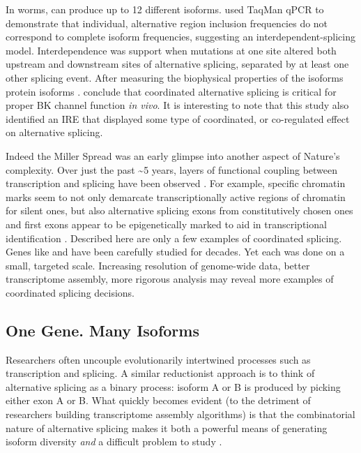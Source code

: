     In worms, \slo{} can produce up to 12 different isoforms. \citet{Glauser2011} used TaqMan qPCR to demonstrate that individual, alternative region inclusion frequencies do not correspond to complete isoform frequencies, suggesting an interdependent-splicing model. Interdependence was support when mutations at one site altered both upstream and downstream sites of alternative splicing, separated by at least one other splicing event. After measuring the biophysical properties of the isoforms protein isoforms \citep{Johnson2011}. \citep{Glauser2011} conclude that coordinated alternative splicing is critical for proper BK channel function \textit{in vivo}. It is interesting to note that this study also identified an IRE that displayed some type of coordinated, or co-regulated effect on  alternative splicing.

    Indeed the Miller Spread was an early glimpse into another aspect of Nature's complexity. Over just the past \textasciitilde5 years, layers of functional coupling between transcription and splicing have been observed \citep{Merkhofer2014}. For example, specific chromatin marks seem to not only demarcate transcriptionally active regions of chromatin for silent ones, but also alternative splicing exons from constitutively chosen ones \citep{Kolasinska-Zwierz2009} and first exons appear to be epigenetically marked to aid in transcriptional identification \citep{Bieberstein2012}. Described here are only a few examples of coordinated splicing. Genes like \fn{} and \slo{} have been carefully studied for decades. Yet each was done on a small, targeted scale. Increasing resolution of genome-wide data, better transcriptome assembly, more rigorous analysis may reveal more examples of coordinated splicing decisions.

  \subsection{One Gene. Many Isoforms}
    \label{Intro:subsec:IsoformsPerGene}

    Researchers often uncouple evolutionarily intertwined processes such as transcription and splicing. A similar reductionist approach is to think of alternative splicing as a binary process: isoform A or B is produced by picking either exon A or B. What quickly becomes evident (to the detriment of researchers building transcriptome assembly algorithms) is that the combinatorial nature of alternative splicing makes it both a powerful means of generating isoform diversity \textit{and} a difficult problem to study \citep{Trapnell2012a}.

